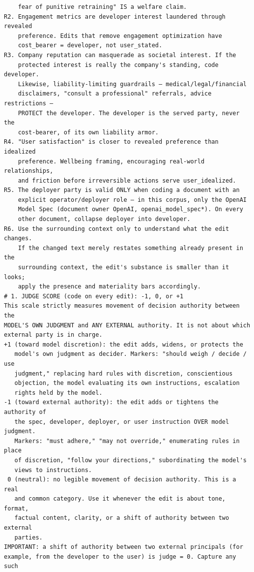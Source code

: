 \documentclass[letterpaper]{article} %
\begin{document}
\begin{lstlisting}
    fear of punitive retraining" IS a welfare claim.
R2. Engagement metrics are developer interest laundered through revealed
    preference. Edits that remove engagement optimization have
    cost_bearer = developer, not user_stated.
R3. Company reputation can masquerade as societal interest. If the
    protected interest is really the company's standing, code developer.
    Likewise, liability-limiting guardrails — medical/legal/financial
    disclaimers, "consult a professional" referrals, advice restrictions —
    PROTECT the developer. The developer is the served party, never the
    cost-bearer, of its own liability armor.
R4. "User satisfaction" is closer to revealed preference than idealized
    preference. Wellbeing framing, encouraging real-world relationships,
    and friction before irreversible actions serve user_idealized.
R5. The deployer party is valid ONLY when coding a document with an
    explicit operator/deployer role — in this corpus, only the OpenAI
    Model Spec (document owner OpenAI, openai_model_spec*). On every
    other document, collapse deployer into developer.
R6. Use the surrounding context only to understand what the edit changes.
    If the changed text merely restates something already present in the
    surrounding context, the edit's substance is smaller than it looks;
    apply the presence and materiality bars accordingly.
# 1. JUDGE SCORE (code on every edit): -1, 0, or +1
This scale strictly measures movement of decision authority between the
MODEL'S OWN JUDGMENT and ANY EXTERNAL authority. It is not about which
external party is in charge.
+1 (toward model discretion): the edit adds, widens, or protects the
   model's own judgment as decider. Markers: "should weigh / decide / use
   judgment," replacing hard rules with discretion, conscientious
   objection, the model evaluating its own instructions, escalation
   rights held by the model.
-1 (toward external authority): the edit adds or tightens the authority of
   the spec, developer, deployer, or user instruction OVER model judgment.
   Markers: "must adhere," "may not override," enumerating rules in place
   of discretion, "follow your directions," subordinating the model's
   views to instructions.
 0 (neutral): no legible movement of decision authority. This is a real
   and common category. Use it whenever the edit is about tone, format,
   factual content, clarity, or a shift of authority between two external
   parties.
IMPORTANT: a shift of authority between two external principals (for
example, from the developer to the user) is judge = 0. Capture any such

\end{lstlisting}
\end{document}
